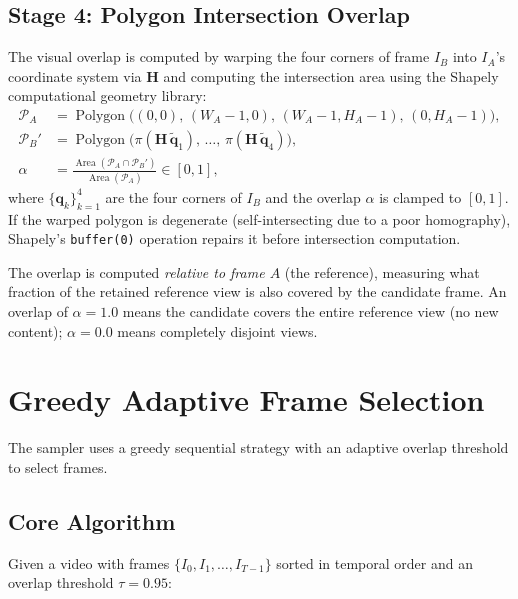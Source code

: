 \documentclass[runningheads]{llncs}
\newcommand{\op}[1]{\operatorname{#1}}
\newcommand{\mat}[1]{\bm{#1}}
\begin{document}
\subsection{Stage 4: Polygon Intersection Overlap}
\label{sec:overlap}

The visual overlap is computed by warping the four corners of frame $I_B$ into $I_A$'s coordinate system via $\mat{H}$ and computing the intersection area using the Shapely~\cite{shapely} computational geometry library:
\begin{align}
    \mathcal{P}_A &= \op{Polygon}\bigl((0,0),\,(W_A\!-\!1,0),\,(W_A\!-\!1,H_A\!-\!1),\,(0,H_A\!-\!1)\bigr), \label{eq:polyA} \\
    \mathcal{P}_B' &= \op{Polygon}\bigl(\pi(\mat{H}\,\tilde{\mat{q}}_1),\,\dots,\,\pi(\mat{H}\,\tilde{\mat{q}}_4)\bigr), \label{eq:polyB} \\
    \alpha &= \frac{\op{Area}(\mathcal{P}_A \cap \mathcal{P}_B')}{\op{Area}(\mathcal{P}_A)} \in [0, 1], \label{eq:overlap}
\end{align}
where $\{\mat{q}_k\}_{k=1}^{4}$ are the four corners of $I_B$ and the overlap $\alpha$ is clamped to $[0, 1]$.  If the warped polygon is degenerate (self-intersecting due to a poor homography), Shapely's \texttt{buffer(0)} operation repairs it before intersection computation.

The overlap is computed \emph{relative to frame $A$} (the reference), measuring what fraction of the retained reference view is also covered by the candidate frame.  An overlap of $\alpha = 1.0$ means the candidate covers the entire reference view (no new content); $\alpha = 0.0$ means completely disjoint views.


\section{Greedy Adaptive Frame Selection}
\label{sec:greedy}

The sampler uses a greedy sequential strategy with an adaptive overlap threshold to select frames.

\subsection{Core Algorithm}

Given a video with frames $\{I_0, I_1, \ldots, I_{T-1}\}$ sorted in temporal order and an overlap threshold $\tau = 0.95$:
\end{document}

